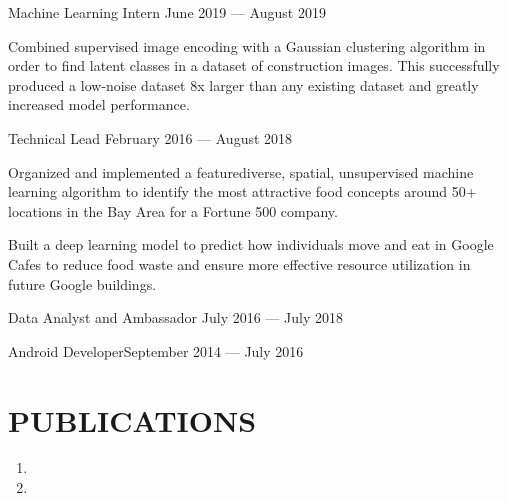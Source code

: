 \documentclass[10pt]{article}
\begin{document}
                {Machine Learning Intern}
                {June 2019 --- August 2019}
                    \begin{accomplishments}
                        \item Combined supervised image encoding with a Gaussian clustering algorithm in order to find latent classes in a dataset of construction images. 
                          This successfully produced a low-noise dataset 8x larger than any existing dataset and greatly increased model performance.
                    \end{accomplishments}

								{Technical Lead}
								{February 2016 --- August 2018}                  		
	                   \begin{accomplishments} 
	                    		\item Organized and implemented a feature{\textendash}diverse, spatial, unsupervised machine learning algorithm to identify the most attractive food concepts around 50+ locations in the Bay Area for a Fortune 500 company.
                          \item Built a deep learning model to predict how individuals move and eat in Google Cafes to reduce food waste and ensure more effective resource utilization in future Google buildings.
	                    \end{accomplishments}
	                    		
	   		
	   			{Data Analyst and Ambassador}
	   			{July 2016 --- July 2018}
        \vspace{0.5em}
                  	 
          {Android Developer}{September 2014 --- July 2016}
        \vspace{0.5em}
                  

\section*{PUBLICATIONS}

\begin{enumerate}
    \item {}
    \item {}
\end{enumerate}
\end{document}
